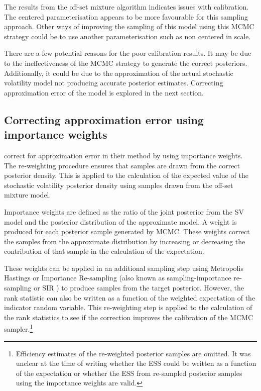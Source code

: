 \documentclass[12pt, a4paper]{article}
\begin{document}
    The results from the off-set mixture algorithm indicates issues with calibration. The centered parameterisation appears to be more favourable for this sampling approach. Other ways of improving the sampling of this model using this MCMC strategy could be to use another parameterisation such as non centered in scale.

    There are a few potential reasons for the poor calibration results. It may be due to the ineffectiveness of the MCMC strategy to generate the correct posteriors. Additionally, it could be due to the approximation of the actual stochastic volatility model not producing accurate posterior estimates. Correcting approximation error of the model is explored in the next section.  

    
    \subsection{Correcting approximation error using importance weights}
    \citet{kim1998stochastic} correct for approximation error in their method by using importance weights. The re-weighting procedure ensures that samples are drawn from the correct posterior density. This is applied to the calculation of the expected value of the stochastic volatility posterior density using samples drawn from the off-set mixture model. 

    Importance weights are defined as the ratio of the joint posterior from the SV model and the posterior distribution of the approximate model. A weight is produced for each posterior sample generated by MCMC. These weights correct the samples from the approximate distribution by increasing or decreasing the contribution of that sample in the calculation of the expectation. 

    These weights can be applied in an additional sampling step using Metropolis Hastings or Importance Re-sampling (also known as sampling-importance re-sampling or SIR \citep{gelman2013bayesian}) to produce samples from the target posterior. However, the rank statistic can also be written as a function of the weighted expectation of the indicator random variable. This re-weighting step is applied to the calculation of the rank statistics to see if the correction improves the calibration of the MCMC sampler.\footnote{Efficiency estimates of the re-weighted posterior samples are omitted. It was unclear at the time of writing whether the ESS could be written as a function of the expectation or whether the ESS from re-sampled posterior samples using the importance weights are valid.}
\end{document}
